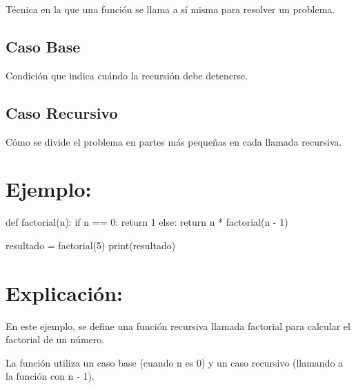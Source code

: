 \documentclass[
  a4paper,
  onepage,
  openany]{scrreprt}
\newenvironment{Shaded}{\begin{snugshade}}{\end{snugshade}}
\newcommand{\BuiltInTok}[1]{\textcolor[rgb]{0.00,0.23,0.31}{#1}}
\newcommand{\ControlFlowTok}[1]{\textcolor[rgb]{0.00,0.23,0.31}{#1}}
\newcommand{\DecValTok}[1]{\textcolor[rgb]{0.68,0.00,0.00}{#1}}
\newcommand{\KeywordTok}[1]{\textcolor[rgb]{0.00,0.23,0.31}{#1}}
\newcommand{\NormalTok}[1]{\textcolor[rgb]{0.00,0.23,0.31}{#1}}
\newcommand{\OperatorTok}[1]{\textcolor[rgb]{0.37,0.37,0.37}{#1}}
\begin{document}
Técnica en la que una función se llama a sí misma para resolver un
problema.

\hypertarget{caso-base}{%
\subsection{Caso Base}\label{caso-base}}

Condición que indica cuándo la recursión debe detenerse.

\hypertarget{caso-recursivo}{%
\subsection{Caso Recursivo}\label{caso-recursivo}}

Cómo se divide el problema en partes más pequeñas en cada llamada
recursiva.

\hypertarget{ejemplo-46}{%
\section{Ejemplo:}\label{ejemplo-46}}

\begin{Shaded}
\begin{Highlighting}[]
\KeywordTok{def}\NormalTok{ factorial(n):}
    \ControlFlowTok{if}\NormalTok{ n }\OperatorTok{==} \DecValTok{0}\NormalTok{:}
        \ControlFlowTok{return} \DecValTok{1}
    \ControlFlowTok{else}\NormalTok{:}
        \ControlFlowTok{return}\NormalTok{ n }\OperatorTok{*}\NormalTok{ factorial(n }\OperatorTok{{-}} \DecValTok{1}\NormalTok{)}

\NormalTok{resultado }\OperatorTok{=}\NormalTok{ factorial(}\DecValTok{5}\NormalTok{)}
\BuiltInTok{print}\NormalTok{(resultado)}
\end{Highlighting}
\end{Shaded}

\hypertarget{explicaciuxf3n-46}{%
\section{Explicación:}\label{explicaciuxf3n-46}}

En este ejemplo, se define una función recursiva llamada factorial para
calcular el factorial de un número.

La función utiliza un caso base (cuando n es 0) y un caso recursivo
(llamando a la función con n - 1).
\end{document}
